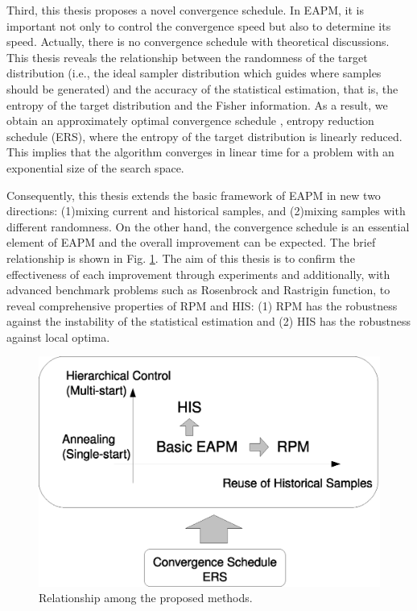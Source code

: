 Third,
this thesis proposes a novel convergence schedule.
In EAPM,
it is important not only to control the convergence speed
but also to determine its speed.
Actually, there is no convergence schedule with theoretical discussions.
This thesis reveals the relationship between
the randomness of the target distribution
(i.e., the ideal sampler distribution 
which guides where samples should be generated)
and the accuracy of the statistical estimation,
that is,
the entropy of the target distribution and the Fisher information.
As a result, we obtain an approximately optimal convergence schedule
, entropy reduction schedule (ERS),
where the entropy of the target distribution
is linearly reduced.
This implies that the algorithm converges in linear time for a problem
with
an exponential size of the search space.

Consequently, this thesis extends
the basic framework of EAPM in new two directions:
(1)mixing current and  historical samples,
 and (2)mixing samples with different randomness.
On the other hand, the convergence schedule is an essential element of
EAPM and the overall improvement can be expected.
The brief relationship is shown in Fig. \ref{intro-relation}.
The aim of this thesis is to confirm 
the effectiveness of each improvement through experiments
and
additionally, 
with advanced benchmark problems such as Rosenbrock and Rastrigin function,
to reveal comprehensive properties of RPM and HIS:
(1) RPM has the robustness 
against the instability of the statistical estimation and 
(2) HIS has the robustness against local optima.
\begin{figure}[tbp]
\centerline{\includegraphics[width=\figlength\linewidth]{data_intro/relation.eps}}
\caption{Relationship among the proposed methods.}
\label{intro-relation}
\end{figure}

